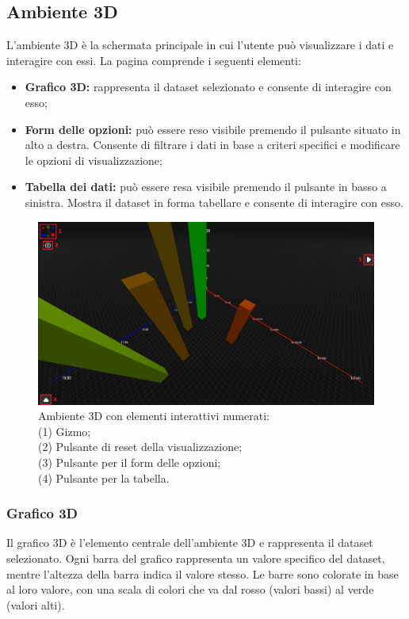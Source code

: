\subsection{Ambiente 3D}
L'ambiente 3D è la schermata principale in cui l'utente può visualizzare i dati
e interagire con essi. La pagina comprende i seguenti elementi:
\begin{itemize}
    \item \textbf{Grafico 3D:} rappresenta il dataset selezionato e consente di
          interagire con esso;
    \item \textbf{Form delle opzioni:} può essere reso visibile premendo
          il pulsante situato in alto a destra. Consente di filtrare i dati in
          base a criteri specifici e modificare le opzioni di visualizzazione;
    \item \textbf{Tabella dei dati:} può essere resa visibile premendo il
          pulsante in basso a sinistra. Mostra il dataset in forma tabellare e
          consente di interagire con esso.
\end{itemize}
\begin{figure}[ht!]
    \centering
    \includegraphics[scale=0.29]{template/images/envpage.png}
    \caption{
        Ambiente 3D con elementi interattivi numerati:\\
        (1) Gizmo;\\
        (2) Pulsante di reset della visualizzazione;\\
        (3) Pulsante per il form delle opzioni;\\
        (4) Pulsante per la tabella.
    }
\end{figure}
\subsubsection{Grafico 3D}
Il grafico 3D è l'elemento centrale dell'ambiente 3D e rappresenta il dataset
selezionato. Ogni barra del grafico rappresenta un valore specifico del
dataset, mentre l'altezza della barra indica il valore stesso. Le barre sono
colorate in base al loro valore, con una scala di colori che va dal rosso
(valori bassi) al verde (valori alti).

